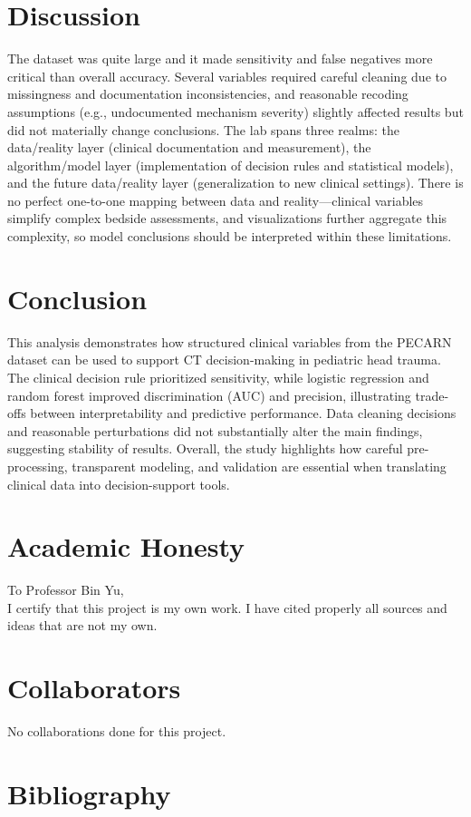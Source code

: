 \documentclass[11pt]{article}
\begin{document}
\section{Discussion}
The dataset was quite large and it made sensitivity and false negatives more critical than overall accuracy. Several variables required careful cleaning due to missingness and documentation inconsistencies, and reasonable recoding assumptions (e.g., undocumented mechanism severity) slightly affected results but did not materially change conclusions. The lab spans three realms: the data/reality layer (clinical documentation and measurement), the algorithm/model layer (implementation of decision rules and statistical models), and the future data/reality layer (generalization to new clinical settings). There is no perfect one-to-one mapping between data and reality—clinical variables simplify complex bedside assessments, and visualizations further aggregate this complexity, so model conclusions should be interpreted within these limitations.
\section{Conclusion}
This analysis demonstrates how structured clinical variables from the PECARN dataset can be used to support CT decision-making in pediatric head trauma. The clinical decision rule prioritized sensitivity, while logistic regression and random forest improved discrimination (AUC) and precision, illustrating trade-offs between interpretability and predictive performance. Data cleaning decisions and reasonable perturbations did not substantially alter the main findings, suggesting stability of results. Overall, the study highlights how careful pre-processing, transparent modeling, and validation are essential when translating clinical data into decision-support tools.
\section{Academic Honesty}
To Professor Bin Yu,\\
I certify that this project is my own work. I have cited properly all sources and ideas that are not my own.
\section{Collaborators}
No collaborations done for this project.
\section{Bibliography}


\end{document}
